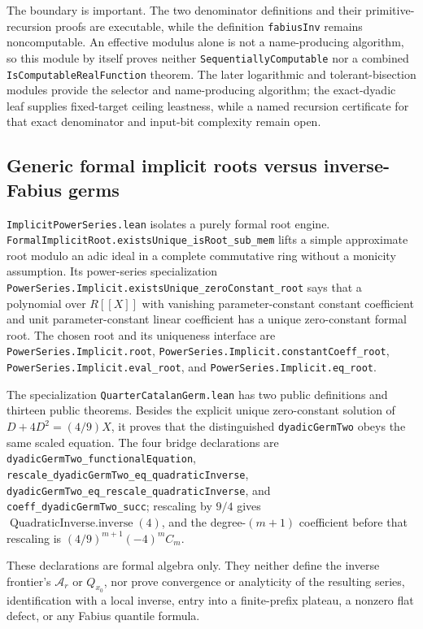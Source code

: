 \documentclass[11pt,oneside]{article}
\theoremstyle{definition}
\theoremstyle{remark}
\begin{document}
The boundary is important.  The two denominator definitions and their
primitive-recursion proofs are executable, while the definition
\nolinkurl{fabiusInv} remains noncomputable.  An effective modulus alone is
not a name-producing algorithm, so this module by itself proves neither
\nolinkurl{SequentiallyComputable} nor a combined
\nolinkurl{IsComputableRealFunction} theorem.  The later logarithmic and
tolerant-bisection modules provide the selector and name-producing algorithm;
the exact-dyadic leaf supplies fixed-target ceiling leastness, while a named
recursion certificate for that exact denominator and input-bit complexity
remain open.

\subsection{Generic formal implicit roots versus inverse-Fabius germs}
\nolinkurl{ImplicitPowerSeries.lean} isolates a purely formal root engine.
\nolinkurl{FormalImplicitRoot.existsUnique_isRoot_sub_mem} lifts a simple
approximate root modulo an adic ideal in a complete commutative ring without a
monicity assumption.  Its
power-series specialization
\nolinkurl{PowerSeries.Implicit.existsUnique_zeroConstant_root} says that a
polynomial over \(R[[X]]\) with vanishing parameter-constant
constant coefficient and unit parameter-constant linear coefficient has a
unique zero-constant formal root.  The chosen root and its uniqueness
interface are \nolinkurl{PowerSeries.Implicit.root},
\nolinkurl{PowerSeries.Implicit.constantCoeff_root},
\nolinkurl{PowerSeries.Implicit.eval_root}, and
\nolinkurl{PowerSeries.Implicit.eq_root}.

The specialization \nolinkurl{QuarterCatalanGerm.lean} has two public
definitions and thirteen public theorems.  Besides the explicit unique
zero-constant solution of \(D+4D^2=(4/9)X\), it proves that the distinguished
\nolinkurl{dyadicGermTwo} obeys the same scaled equation.  The four bridge
declarations are \nolinkurl{dyadicGermTwo_functionalEquation},
\nolinkurl{rescale_dyadicGermTwo_eq_quadraticInverse},
\nolinkurl{dyadicGermTwo_eq_rescale_quadraticInverse}, and
\nolinkurl{coeff_dyadicGermTwo_succ}; rescaling by \(9/4\) gives
\(\operatorname{QuadraticInverse.inverse}(4)\), and the degree-\((m+1)\)
coefficient before that rescaling is
\((4/9)^{m+1}(-4)^mC_m\).

These declarations are formal algebra only.  They neither define the inverse
frontier's \(\mathcal A_r\) or \(Q_{x_0}\), nor prove convergence or analyticity
of the resulting series, identification with a local inverse, entry into a
finite-prefix plateau, a nonzero flat defect, or any Fabius quantile formula.
\end{document}
